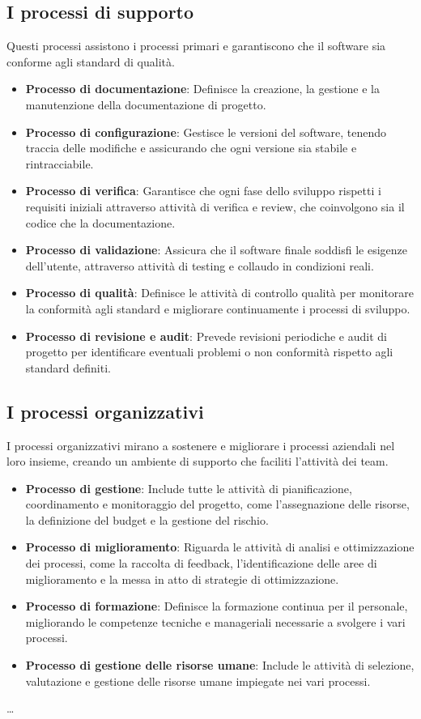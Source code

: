 \subsection{I processi di supporto}
Questi processi assistono i processi primari e garantiscono che il software sia conforme agli standard di qualità.
\begin{itemize}
    \item \textbf{Processo di documentazione}: Definisce la creazione, la gestione e la manutenzione della documentazione di progetto.
    \item \textbf{Processo di configurazione}: Gestisce le versioni del software, tenendo traccia delle modifiche e assicurando che ogni versione sia stabile e rintracciabile.
    \item \textbf{Processo di verifica}: Garantisce che ogni fase dello sviluppo rispetti i requisiti iniziali attraverso attività di verifica e review, che coinvolgono sia il codice che la documentazione.
    \item \textbf{Processo di validazione}: Assicura che il software finale soddisfi le esigenze dell'utente, attraverso attività di testing e collaudo in condizioni reali.
    \item \textbf{Processo di qualità}: Definisce le attività di controllo qualità per monitorare la conformità agli standard e migliorare continuamente i processi di sviluppo.
    \item \textbf{Processo di revisione e audit}: Prevede revisioni periodiche e audit di progetto per identificare eventuali problemi o non conformità rispetto agli standard definiti.
\end{itemize}

\subsection{I processi organizzativi}
I processi organizzativi mirano a sostenere e migliorare i processi aziendali nel loro insieme, creando un ambiente di supporto che faciliti l'attività dei team.
\begin{itemize}
    \item \textbf{Processo di gestione}: Include tutte le attività di pianificazione, coordinamento e monitoraggio del progetto, come l'assegnazione delle risorse, la definizione del budget e la gestione del rischio.
    \item \textbf{Processo di miglioramento}: Riguarda le attività di analisi e ottimizzazione dei processi, come la raccolta di feedback, l'identificazione delle aree di miglioramento e la messa in atto di strategie di ottimizzazione.
    \item \textbf{Processo di formazione}: Definisce la formazione continua per il personale, migliorando le competenze tecniche e manageriali necessarie a svolgere i vari processi.
    \item \textbf{Processo di gestione delle risorse umane}: Include le attività di selezione, valutazione e gestione delle risorse umane impiegate nei vari processi.
\end{itemize}

\dots